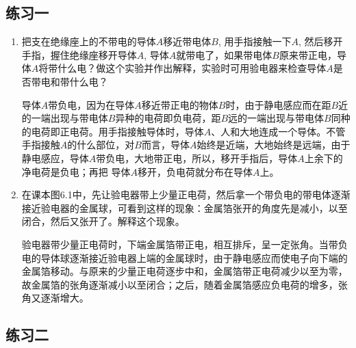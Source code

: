 \subsection{练习一}
\begin{enumerate}
    \item 把支在绝缘座上的不带电的导体$A$移近带电体$B$, 用手指接触一下$A$, 然后移开手指，握住绝缘座移开导体$A$, 导体$A$就带电了，如果带电体$B$原来带正电，导体$A$将带什么电？做这个实验并作出解释，实验时可用验电器来检查导体$A$是否带电和带什么电？
    
    \begin{solution}
        导体$A$带负电，因为在导体$A$移近带正电的物体$B$时，由于静电感应而在距$B$近的一端出现与带电体$B$异种的电荷即负电荷，距$B$远的一端出现与带电体$B$同种的电荷即正电荷。用手指接触导体时，导体$A$、人和大地连成一个导体。不管手指接触$A$的什么部位，对$B$而言，导体$A$始终是近端，大地始终是远端，由于静电感应，导体$A$带负电，大地带正电，所以，移开手指后，导体$A$上余下的净电荷是负电；再把 导体$A$移开，负电荷就分布在导体$A$上。
    \end{solution}
   
    \item 在课本图6.1中，先让验电器带上少量正电荷，然后拿一个带负电的带电体逐渐接近验电器的金属球，可看到这样的现象：金属箔张开的角度先是减小，以至闭合，然后又张开了。解释这个现象。
    
\begin{solution}
  验电器带少量正电荷时，下端金属箔带正电，相互排斥，呈一定张角。当带负电的导体球逐渐接近验电器上端的金属球时，由于静电感应而使电子向下端的金属箔移动。与原来的少量正电荷逐步中和，金属箔带正电荷减少以至为零，故金属箔的张角逐渐减小以至闭合；之后，随着金属箔感应负电荷的增多，张角又逐渐增大。   
\end{solution}
\end{enumerate}



\subsection{练习二}

